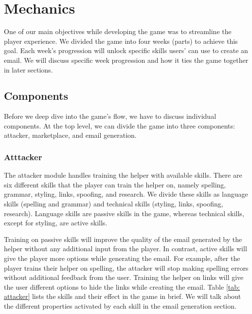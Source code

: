 \section{Mechanics}
One of our main objectives while developing the game was to streamline the player experience. We divided the game into four weeks (parts) to achieve this goal. Each week's progression will unlock specific skills users' can use to create an email. We will discuss specific week progression and how it ties the game together in later sections.

\subsection{Components}
Before we deep dive into the game's flow, we have to discuss individual components. At the top level, we can divide the game into three components: attacker, marketplace, and email generation.

\subsubsection{Atttacker}
The attacker module handles training the helper with available skills. There are six different skills that the player can train the helper on, namely spelling, grammar, styling, links, spoofing, and research. We divide these skills as language skills (spelling and grammar) and technical skills (styling, links, spoofing, research). Language skills are passive skills in the game, whereas technical skills, except for styling, are active skills.

Training on passive skills will improve the quality of the email generated by the helper without any additional input from the player. In contrast, active skills will give the player more options while generating the email. For example, after the player trains their helper on spelling, the attacker will stop making spelling errors without additional feedback from the user. Training the helper on links will give the user different options to hide the links while creating the email. Table \ref{tab: attacker} lists the skills and their effect in the game in brief. We will talk about the different properties activated by each skill in the email generation section.

